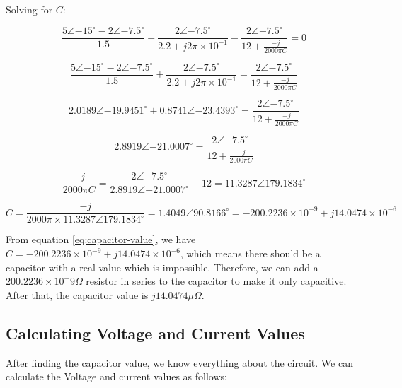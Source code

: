 Solving for $C$:

\begin{equation}
    \frac{5 \angle{-15^{\circ}} - 2 \angle{-7.5^{\circ}}}{1.5} + \frac{2 \angle{-7.5^{\circ}}}{2.2 + j 2\pi \times 10^{-1}} - \frac{2 \angle{-7.5^{\circ}}}{12 + \frac{-j}{2000\pi C}} = 0
\end{equation}

\begin{equation}
    \frac{5 \angle{-15^{\circ}} - 2 \angle{-7.5^{\circ}}}{1.5} + \frac{2 \angle{-7.5^{\circ}}}{2.2 + j 2\pi \times 10^{-1}} = \frac{2 \angle{-7.5^{\circ}}}{12 + \frac{-j}{2000\pi C}}
\end{equation}

\begin{equation}
    2.0189 \angle{-19.9451^{\circ}} + 0.8741 \angle{-23.4393^{\circ}} = \frac{2 \angle{-7.5^{\circ}}}{12 + \frac{-j}{2000\pi C}}
\end{equation}

\begin{equation}
    2.8919 \angle{-21.0007^{\circ}} = \frac{2 \angle{-7.5^{\circ}}}{12 + \frac{-j}{2000\pi C}}
\end{equation}

\begin{equation}
    \frac{-j}{2000\pi C} = \frac{2 \angle{-7.5^{\circ}}}{2.8919 \angle{-21.0007^{\circ}}} - 12 = 11.3287 \angle{179.1834^{\circ}}
\end{equation}

\begin{equation}\label{eq:capacitor-value}
    C = \frac{-j}{2000\pi \times 11.3287 \angle{179.1834^{\circ}}} = 1.4049 \angle{90.8166^{\circ}} = -200.2236 \times 10^{-9} + j14.0474 \times 10^{-6}
\end{equation}

From equation \ref{eq:capacitor-value}, we have $C = -200.2236 \times 10^{-9} + j14.0474 \times 10^{-6}$, which means there should be a capacitor with a real value which is impossible. Therefore, we can add a $200.2236 \times 10^-9 \Omega$ resistor in series to the capacitor to make it only capacitive. After that, the capacitor value is $j14.0474 \mu \Omega$.

\subsection{Calculating Voltage and Current Values}

After finding the capacitor value, we know everything about the circuit. We can calculate the Voltage and current values as follows:

